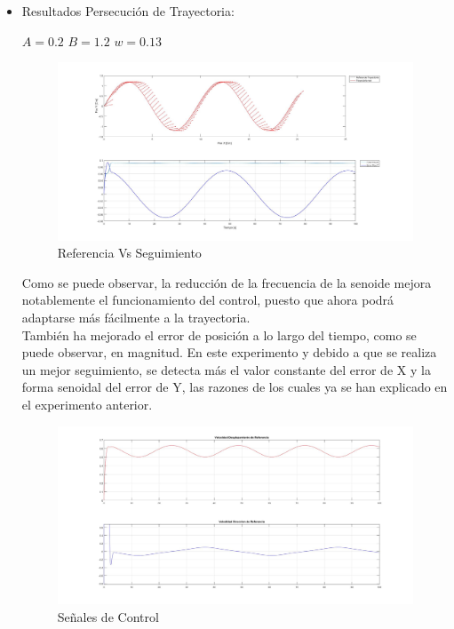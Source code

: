 \documentclass[a4paper,twoside]{article}
\begin{document}
\begin{itemize}
	\item Resultados Persecución de Trayectoria:
	\begin{center}
		$A=0.2$    \hspace{0.2cm}   
		$B=1.2$    \hspace{0.2cm} 
		$w=0.13$ \\
	\end{center}

	
	\begin{figure}[h!]
		\centering
		\includegraphics[width=1\textwidth]{PurePursuitSeguimientoFlama_Error}
		\caption{Referencia Vs Seguimiento}
	\end{figure}
\newpage
	Como se puede observar, la reducción de la frecuencia de la senoide mejora notablemente el funcionamiento del control, puesto que ahora podrá adaptarse más fácilmente a la trayectoria.\\
	También ha mejorado el error de posición a lo largo del tiempo, como se puede observar, en magnitud. En este experimento y debido a que se realiza un mejor seguimiento, se detecta más el valor constante del error de X y la forma senoidal del error de Y, las razones de los cuales ya se han explicado en el experimento anterior.

	\begin{figure}[h!]
		\centering
		\includegraphics[width=1\textwidth]{PurePursuitValoresEntradaFlama}
		\caption{Señales de Control}
	\end{figure}


\end{itemize}
\end{document}
